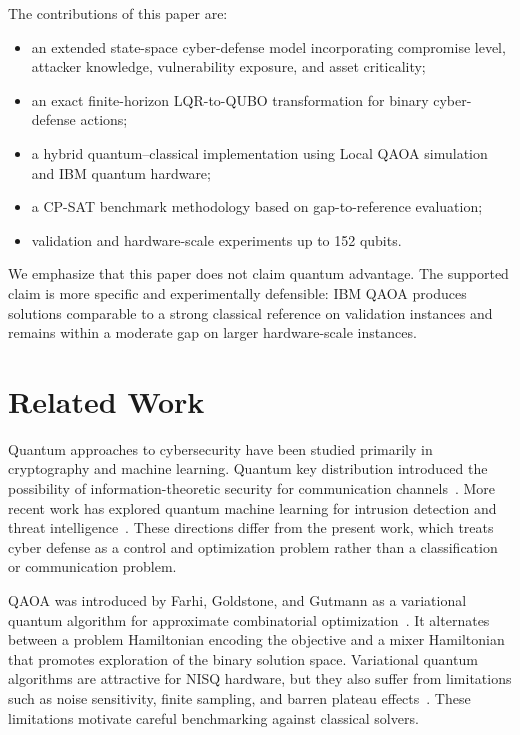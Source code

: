 \documentclass[runningheads]{llncs}
\begin{document}
The contributions of this paper are:
\begin{itemize}
    \item an extended state-space cyber-defense model incorporating compromise level, attacker knowledge, vulnerability exposure, and asset criticality;
    \item an exact finite-horizon LQR-to-QUBO transformation for binary cyber-defense actions;
    \item a hybrid quantum--classical implementation using Local QAOA simulation and IBM quantum hardware;
    \item a CP-SAT benchmark methodology based on gap-to-reference evaluation;
    \item validation and hardware-scale experiments up to 152 qubits.
\end{itemize}

We emphasize that this paper does not claim quantum advantage. The supported claim is more specific and experimentally defensible: IBM QAOA produces solutions comparable to a strong classical reference on validation instances and remains within a moderate gap on larger hardware-scale instances.

\section{Related Work}

Quantum approaches to cybersecurity have been studied primarily in cryptography and machine learning. Quantum key distribution introduced the possibility of information-theoretic security for communication channels~\cite{bennett1984quantum}. More recent work has explored quantum machine learning for intrusion detection and threat intelligence~\cite{garg2022quantum}. These directions differ from the present work, which treats cyber defense as a control and optimization problem rather than a classification or communication problem.

QAOA was introduced by Farhi, Goldstone, and Gutmann as a variational quantum algorithm for approximate combinatorial optimization~\cite{farhi2014qaoa}. It alternates between a problem Hamiltonian encoding the objective and a mixer Hamiltonian that promotes exploration of the binary solution space. Variational quantum algorithms are attractive for NISQ hardware, but they also suffer from limitations such as noise sensitivity, finite sampling, and barren plateau effects~\cite{cerezo2021variational,mcclean2018barren}. These limitations motivate careful benchmarking against classical solvers.
\end{document}
